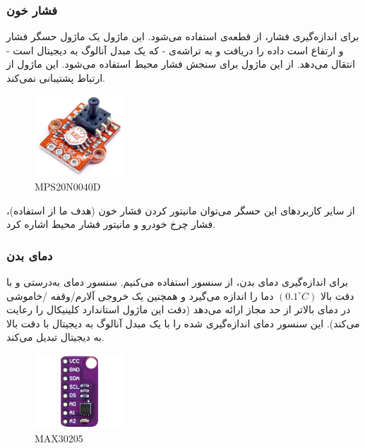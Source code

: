 \documentclass[12pt]{article}
\begin{document}
\subsubsection{فشار خون}
برای اندازه‌گیری فشار، از قطعه‌ی
استفاده می‌شود. این ماژول یک ماژول حسگر فشار و ارتفاع است داده را دریافت و به تراشه‌ی
- که یک مبدل آنالوگ به دیجیتال است - انتقال می‌دهد. از این ماژول برای سنجش فشار محیط استفاده می‌شود. این ماژول از ارتباط
پشتیبانی نمی‌کند.

\begin{figure}[h]
	\begin{center}
		\includegraphics[width=0.3\textwidth]{MPS20N0040D}
	\end{center}
	\caption{MPS20N0040D}
\end{figure}

از سایر کاربردهای این حسگر می‌توان مانیتور کردن فشار خون (هدف ما از استفاده)، فشار چرخ خودرو و مانیتور فشار محیط اشاره کرد.

\subsubsection{دمای بدن}
برای اندازه‌گیری دمای بدن، از سنسور
استفاده می‌کنیم. سنسور دمای
به‌درستی و با دقت بالا
$(0.1^\circ C)$
دما را اندازه می‌گیرد و همچنین یک خروجی آلارم/وقفه
/خاموشی در دمای بالاتر از حد مجاز ارائه می‌دهد (دقت این ماژول استاندارد کلینیکال
را رعایت می‌کند).
این سنسور دمای اندازه‌گیری شده را با یک مبدل آنالوگ به دیجیتال
با دقت بالا به دیجیتال تبدیل می‌کند.

\begin{figure}[h]
	\begin{center}
		\includegraphics[width=0.3\textwidth]{MAX30205}
	\end{center}
	\caption{MAX30205}
\end{figure}
\end{document}
